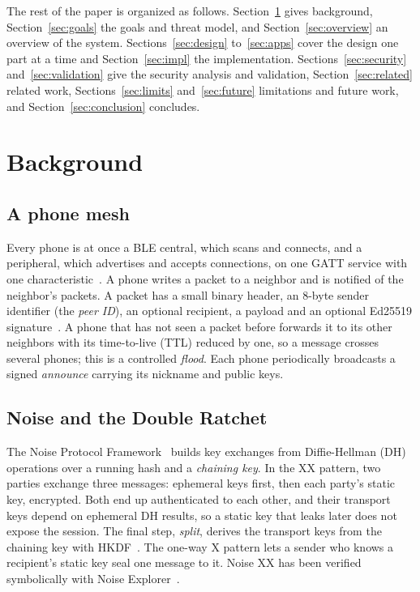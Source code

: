 \documentclass[conference]{IEEEtran}
\begin{document}
The rest of the paper is organized as follows. Section~\ref{sec:background} gives background, Section~\ref{sec:goals} the goals and threat model, and Section~\ref{sec:overview} an overview of the system. Sections~\ref{sec:design} to~\ref{sec:apps} cover the design one part at a time and Section~\ref{sec:impl} the implementation. Sections~\ref{sec:security} and~\ref{sec:validation} give the security analysis and validation, Section~\ref{sec:related} related work, Sections~\ref{sec:limits} and~\ref{sec:future} limitations and future work, and Section~\ref{sec:conclusion} concludes.

\section{Background}
\label{sec:background}

\subsection{A phone mesh}
Every phone is at once a BLE central, which scans and connects, and a peripheral, which advertises and accepts connections, on one GATT service with one characteristic~\cite{btcore}. A phone writes a packet to a neighbor and is notified of the neighbor's packets. A packet has a small binary header, an 8-byte sender identifier (the \emph{peer ID}), an optional recipient, a payload and an optional Ed25519 signature~\cite{rfc8032}. A phone that has not seen a packet before forwards it to its other neighbors with its time-to-live (TTL) reduced by one, so a message crosses several phones; this is a controlled \emph{flood}. Each phone periodically broadcasts a signed \emph{announce} carrying its nickname and public keys.

\subsection{Noise and the Double Ratchet}
The Noise Protocol Framework~\cite{noise} builds key exchanges from Diffie-Hellman (DH) operations over a running hash and a \emph{chaining key}. In the XX pattern, two parties exchange three messages: ephemeral keys first, then each party's static key, encrypted. Both end up authenticated to each other, and their transport keys depend on ephemeral DH results, so a static key that leaks later does not expose the session. The final step, \emph{split}, derives the transport keys from the chaining key with HKDF~\cite{rfc5869}. The one-way X pattern lets a sender who knows a recipient's static key seal one message to it. Noise XX has been verified symbolically with Noise Explorer~\cite{noiseexplorer}.
\end{document}
